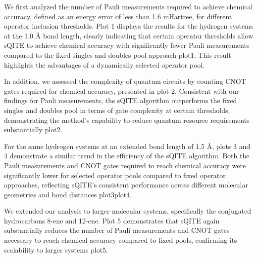 \documentclass[aip,jcp,amsmath,amssymb, reprint]{revtex4-1}
\begin{document}
We first analyzed the number of Pauli measurements required to achieve chemical accuracy, defined as an energy error of less than 1.6 mHartree, for different operator inclusion thresholds. Plot 1 displays the results for the hydrogen systems at the 1.0 Å bond length, clearly indicating that certain operator thresholds allow sQITE to achieve chemical accuracy with significantly fewer Pauli measurements compared to the fixed singles and doubles pool approach {plot1}. This result highlights the advantages of a dynamically selected operator pool.

In addition, we assessed the complexity of quantum circuits by counting CNOT gates required for chemical accuracy, presented in plot 2. Consistent with our findings for Pauli measurements, the sQITE algorithm outperforms the fixed singles and doubles pool in terms of gate complexity at certain thresholds, demonstrating the method's capability to reduce quantum resource requirements substantially {plot2}.

For the same hydrogen systems at an extended bond length of 1.5 Å, plots 3 and 4 demonstrate a similar trend in the efficiency of the sQITE algorithm. Both the Pauli measurements and CNOT gates required to reach chemical accuracy were significantly lower for selected operator pools compared to fixed operator approaches, reflecting sQITE's consistent performance across different molecular geometries and bond distances {plot3}{plot4}.

We extended our analysis to larger molecular systems, specifically the conjugated hydrocarbons 8-ene and 12-ene. Plot 5 demonstrates that sQITE again substantially reduces the number of Pauli measurements and CNOT gates necessary to reach chemical accuracy compared to fixed pools, confirming its scalability to larger systems {plot5}.
\end{document}
